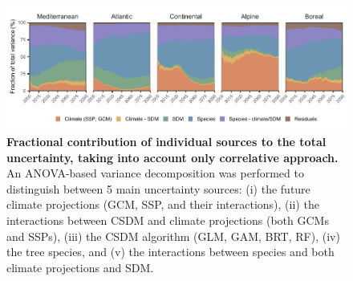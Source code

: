\begin{figure}[htpb]
\centering
\includegraphics{chapter4/figs/anova_across_species_byecoregion_ONLYCSDM-1.pdf}
\caption{\textbf{Fractional contribution of individual sources to the total uncertainty, taking into account only correlative approach.} An ANOVA-based variance decomposition was performed to distinguish between 5 main uncertainty sources: (i) the future climate projections (GCM, SSP, and their interactions), (ii) the interactions between CSDM and climate projections (both GCMs and SSPs), (iii) the CSDM algorithm (GLM, GAM, BRT, RF), (iv) the tree species, and (v) the interactions between species and both climate projections and SDM.}
\end{figure}

